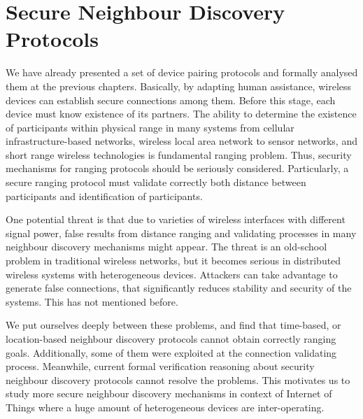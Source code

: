 
\chapter{Secure Neighbour Discovery Protocols} %

\label{Chapter4} %



We have already presented a set of device pairing protocols and formally analysed them at the previous chapters. Basically, by adapting human assistance, wireless devices can establish secure connections among them. Before this stage, each device must know existence of its partners. The ability to determine the existence of participants within physical range in many systems from cellular infrastructure-based networks, wireless local area network to sensor networks, and short range wireless technologies is fundamental ranging problem. Thus, security mechanisms for ranging protocols should be seriously considered. Particularly, a secure ranging protocol must validate correctly both distance between participants and identification of participants. 

One potential threat is that due to varieties of wireless interfaces with different signal power, false results from distance ranging and validating processes in many neighbour discovery mechanisms might appear. The threat is an old-school problem in traditional wireless networks, but it becomes serious in distributed wireless systems with heterogeneous devices. Attackers can take advantage to generate false connections, that significantly reduces stability and security of the systems. This has not mentioned before. 

We put ourselves deeply between these problems, and find that time-based, or location-based neighbour discovery protocols cannot obtain correctly ranging goals. Additionally, some of them were exploited at the connection validating process. Meanwhile, current formal verification reasoning about security neighbour discovery protocols cannot resolve the problems. This motivates us to study more secure neighbour discovery mechanisms in context of Internet of Things where a huge amount of heterogeneous devices are inter-operating. 

